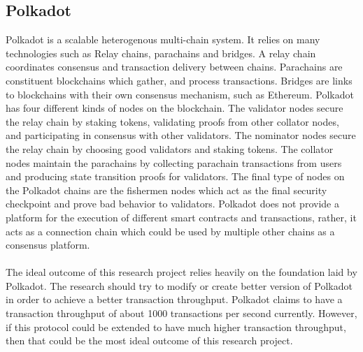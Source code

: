 \documentclass[a4paper,twoside,phd]{BYUPhys}
\begin{document}
\subsection{Polkadot}
Polkadot is a scalable heterogenous multi-chain system. It relies on many technologies such as Relay chains, parachains and bridges. A relay chain coordinates consensus and transaction delivery between chains. Parachains are constituent blockchains which gather, and process transactions. Bridges are links to blockchains with their own consensus mechanism, such as Ethereum. Polkadot has four different kinds of nodes on the blockchain. The validator nodes secure the relay chain by staking tokens, validating proofs from other collator nodes, and participating in consensus with other validators. The nominator nodes secure the relay chain by choosing good validators and staking tokens. The collator nodes maintain the parachains by collecting parachain transactions from users and producing state transition proofs for validators. The final type of nodes on the Polkadot chains are the fishermen nodes which act as the final security checkpoint and prove bad behavior to validators. Polkadot does not provide a platform for the execution of different smart contracts and transactions, rather, it acts as a connection chain which could be used by multiple other chains as a consensus platform. \cite{GavinWood2018PolkadotLight-paper}\cite{GavinWood2018POLKADOT:FRAMEWORK}
\\
\\
The ideal outcome of this research project relies heavily on the foundation laid by Polkadot. The research should try to modify or create better version of Polkadot in order to achieve a better transaction throughput. Polkadot claims to have a transaction throughput of about 1000 transactions per second currently. However, if this protocol could be extended to have much higher transaction throughput, then that could be the most ideal outcome of this research project.
\end{document}
